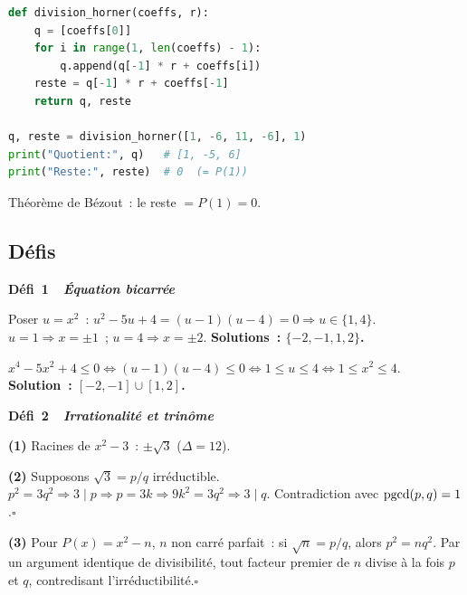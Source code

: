 
\begin{lstlisting}[language=Python]
def division_horner(coeffs, r):
    q = [coeffs[0]]
    for i in range(1, len(coeffs) - 1):
        q.append(q[-1] * r + coeffs[i])
    reste = q[-1] * r + coeffs[-1]
    return q, reste

q, reste = division_horner([1, -6, 11, -6], 1)
print("Quotient:", q)   # [1, -5, 6]
print("Reste:", reste)  # 0  (= P(1))
\end{lstlisting}
Th\'eor\`eme de B\'ezout~: le reste $= P(1) = 0$.\checkmark

\subsection*{D\'efis}

\noindent{}
{\color{BO}\bfseries\small D\'efi~1~\textendash\ \textit{\'Equation bicarr\'ee}}
\par\smallskip

Poser $u=x^2$~: $u^2-5u+4=(u-1)(u-4)=0\Rightarrow u\in\{1,4\}$.
$u=1\Rightarrow x=\pm1$~; $u=4\Rightarrow x=\pm2$.
\textbf{Solutions~: $\{-2,-1,1,2\}$.}

$x^4-5x^2+4\leq0\Leftrightarrow(u-1)(u-4)\leq0\Leftrightarrow1\leq u\leq4\Leftrightarrow1\leq x^2\leq4$.
\textbf{Solution~: $[-2,-1]\cup[1,2]$.}

\noindent{}
{\color{BO}\bfseries\small D\'efi~2~\textendash\ \textit{Irrationalit\'e et trin\^ome}}
\par\smallskip

\textbf{(1)} Racines de $x^2-3$~: $\pm\sqrt{3}$ ($\Delta=12$).

\textbf{(2)} Supposons $\sqrt{3}=p/q$ irr\'eductible.
$p^2=3q^2\Rightarrow3\mid p\Rightarrow p=3k\Rightarrow9k^2=3q^2\Rightarrow3\mid q$.
Contradiction avec $\operatorname{pgcd}(p,q)=1$.\hfill$\square$

\textbf{(3)} Pour $P(x)=x^2-n$, $n$ non carr\'e parfait~:
si $\sqrt{n}=p/q$, alors $p^2=nq^2$. Par un argument identique de divisibilit\'e,
tout facteur premier de $n$ divise \`a la fois $p$ et $q$, contredisant l'irr\'eductibilit\'e.\hfill$\square$

